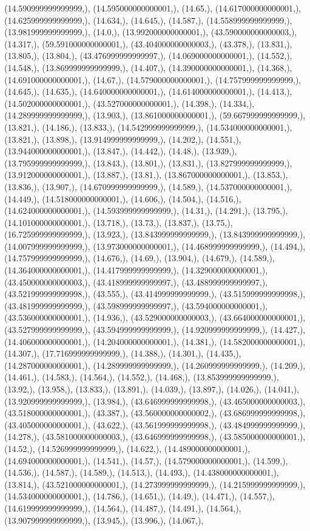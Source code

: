 \documentclass{article}
\begin{document}
(14.590999999999999,), (14.595000000000001,), (14.65,), (14.617000000000001,), (14.625999999999999,), (14.634,), (14.645,), (14.587,), (14.558999999999999,), (13.981999999999999,), (14.0,), (13.992000000000001,), (43.590000000000003,), (14.317,), (59.591000000000001,), (43.404000000000003,), (43.378,), (13.831,), (13.805,), (13.804,), (43.476999999999997,), (14.069000000000001,), (14.552,), (14.548,), (13.869999999999999,), (14.407,), (14.390000000000001,), (14.368,), (14.691000000000001,), (14.67,), (14.579000000000001,), (14.757999999999999,), (14.645,), (14.635,), (14.640000000000001,), (14.614000000000001,), (14.413,), (14.502000000000001,), (43.527000000000001,), (14.398,), (14.334,), (14.289999999999999,), (13.903,), (13.861000000000001,), (59.667999999999999,), (13.821,), (14.186,), (13.833,), (14.542999999999999,), (14.534000000000001,), (13.821,), (13.898,), (13.914999999999999,), (14.202,), (14.551,), (13.944000000000001,), (13.847,), (14.442,), (14.48,), (13.939,), (13.795999999999999,), (13.843,), (13.801,), (13.831,), (13.827999999999999,), (13.912000000000001,), (13.887,), (13.81,), (13.867000000000001,), (13.853,), (13.836,), (13.907,), (14.670999999999999,), (14.589,), (14.537000000000001,), (14.449,), (14.518000000000001,), (14.606,), (14.504,), (14.516,), (14.624000000000001,), (14.593999999999999,), (14.31,), (14.291,), (13.795,), (14.101000000000001,), (13.718,), (13.73,), (13.837,), (13.75,), (16.725999999999999,), (13.923,), (13.843999999999999,), (13.843999999999999,), (14.007999999999999,), (13.973000000000001,), (14.468999999999999,), (14.494,), (14.757999999999999,), (14.676,), (14.69,), (13.904,), (14.679,), (14.589,), (14.364000000000001,), (14.417999999999999,), (14.329000000000001,), (43.450000000000003,), (43.418999999999997,), (43.488999999999997,), (43.521999999999998,), (43.555,), (43.414999999999999,), (43.515999999999998,), (43.481999999999999,), (43.598999999999997,), (43.594000000000001,), (43.536000000000001,), (14.936,), (43.529000000000003,), (43.664000000000001,), (43.527999999999999,), (43.594999999999999,), (14.920999999999999,), (14.427,), (14.406000000000001,), (14.204000000000001,), (14.381,), (14.582000000000001,), (14.307,), (17.716999999999999,), (14.388,), (14.301,), (14.435,), (14.287000000000001,), (14.289999999999999,), (14.260999999999999,), (14.209,), (14.461,), (14.583,), (14.564,), (14.552,), (14.468,), (13.853999999999999,), (13.92,), (13.958,), (13.833,), (13.891,), (14.039,), (13.897,), (14.026,), (14.041,), (13.920999999999999,), (13.984,), (43.646999999999998,), (43.465000000000003,), (43.518000000000001,), (43.387,), (43.560000000000002,), (43.686999999999998,), (43.405000000000001,), (43.622,), (43.561999999999998,), (43.484999999999999,), (14.278,), (43.581000000000003,), (43.646999999999998,), (43.585000000000001,), (14.52,), (14.526999999999999,), (14.622,), (14.489000000000001,), (14.694000000000001,), (14.541,), (14.57,), (14.579000000000001,), (14.599,), (14.536,), (14.587,), (14.589,), (14.513,), (14.493,), (14.438000000000001,), (13.814,), (43.521000000000001,), (14.273999999999999,), (14.215999999999999,), (14.534000000000001,), (14.786,), (14.651,), (14.49,), (14.471,), (14.557,), (14.619999999999999,), (14.564,), (14.487,), (14.491,), (14.564,), (13.907999999999999,), (13.945,), (13.996,), (14.067,), 
\end{document}
